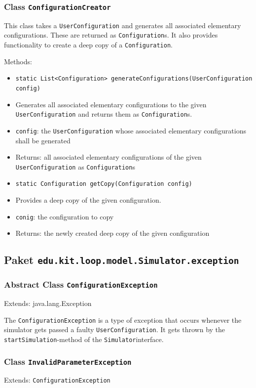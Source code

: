 \documentclass[parskip=full,11pt]{scrartcl}
\begin{document}
\subsubsection{Class \texttt{ConfigurationCreator}}
This class takes a \texttt{UserConfiguration} and generates all associated elementary configurations. These are returned as \texttt{Configuration}s. It also provides functionality to create a deep copy of a \texttt{Configuration}.

Methods:
\begin{itemize}\itemsep -10pt
\item \texttt{static List<Configuration> generateConfigurations(UserConfiguration config)}
\item[] Generates all associated elementary configurations to the given \texttt{UserConfiguration} and returns them as \texttt{Configuration}s.
\item[] \texttt{config}: the \texttt{UserConfiguration} whose associated elementary configurations shall be generated
\item[] Returns: all associated elementary configurations of the given \texttt{UserConfiguration} as \texttt{Configuration}s

\item \texttt{static Configuration getCopy(Configuration config)}
\item[] Provides a deep copy of the given configuration.
\item[] \texttt{conig}: the configuration to copy
\item[] Returns: the newly created deep copy of the given configuration
\end{itemize}

\subsection{Paket \texttt{edu.kit.loop.model.Simulator.exception}}

\subsubsection{Abstract Class \texttt{ConfigurationException }}
Extends: java.lang.Exception

The \texttt{ConfigurationException} is a type of exception that occurs whenever the simulator gets passed a faulty \texttt{UserConfiguration}. It gets thrown by the \texttt{startSimulation}-method of the \texttt{Simulator}interface.

\subsubsection{Class \texttt{InvalidParameterException}}
Extends: \texttt{ConfigurationException}
\end{document}
